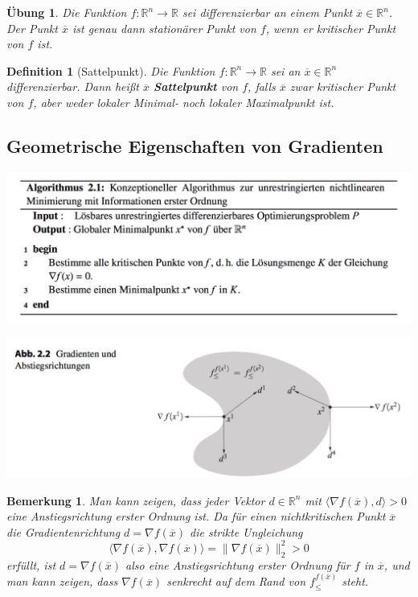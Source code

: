 \documentclass[11pt]{scrreprt}
\newcounter{thm}
\theoremstyle{thmstyle}
\numberwithin{thm}{section}
\newtheorem{definition}[thm]{Definition}
\newtheorem{uebung}[thm]{Übung}
\newtheorem*{bemerkung*}{Bemerkung}
\begin{document}
\begin{uebung}
	Die Funktion $f \colon \mathbb{R}^n \rightarrow \mathbb{R}$ sei differenzierbar an einem Punkt $\overline{x} \in \mathbb{R}^n$. Der Punkt $\overline{x}$ ist genau dann stationärer Punkt von $f$, wenn er kritischer Punkt von $f$ ist.	
\end{uebung}

\setcounter{thm}{16}

\begin{definition}[Sattelpunkt]
	Die Funktion $f \colon \mathbb{R}^n \rightarrow \mathbb{R}$ sei an $\overline{x} \in \mathbb{R}^n$ differenzierbar. Dann heißt $\overline{x}$ \textbf{Sattelpunkt} von $f$, falls $\overline{x}$ zwar kritischer Punkt von $f$, aber weder lokaler Minimal- noch lokaler Maximalpunkt ist.
\end{definition}

\subsection*{Geometrische Eigenschaften von Gradienten}

\begin{center}
	\includegraphics[scale=0.5]{img/a21}
\end{center}

\begin{center}
	\includegraphics[scale=0.5]{img/ab22}
\end{center}

\setcounter{thm}{18}

\begin{bemerkung*}
	Man kann zeigen, dass jeder Vektor $d \in \mathbb{R}^n$ mit $\langle \nabla f(\overline{x}), d \rangle > 0$ eine Anstiegsrichtung erster Ordnung ist. Da für einen nichtkritischen Punkt $\overline{x}$ die Gradientenrichtung $d =\nabla f(\overline{x})$ die strikte Ungleichung
	$$ \langle \nabla f(\overline{x}), \nabla f(\overline{x}) \rangle = \| \nabla f(\overline{x}) \|_2^2 > 0 $$
	erfüllt, ist $d = \nabla f(\overline{x})$ also eine Anstiegsrichtung erster Ordnung für $f$ in $\overline{x}$, und man kann zeigen, dass $\nabla f(\overline{x})$ senkrecht auf dem Rand von $f_{\leq}^{f(\overline{x})}$ steht.
\end{bemerkung*}
\end{document}
